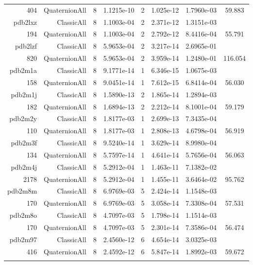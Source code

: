 \begin{xltabular}{\textwidth}{r|rcS[table-format=1.4e+2]cS[table-format=1.3e+2]S[table-format=1.4e+2]S[table-format=-1.3]}
404 & QuaternionAll & 8 & 1.1215e-10 & 2 & 1.025e-12 & 1.7960e-03 & 59.883\\  \addlinespace
pdb2lxz & ClassicAll & 8 & 1.1003e-04 & 2 & 2.371e-12 & 1.3151e-03 & \\
194 & QuaternionAll & 8 & 1.1003e-04 & 2 & 2.792e-12 & 8.4416e-04 & 55.791\\  \addlinespace
pdb2lzf & ClassicAll & 8 & 5.9653e-04 & 2 & 3.217e-14 & 2.6965e-01 & \\
820 & QuaternionAll & 8 & 5.9653e-04 & 2 & 3.959e-14 & 1.2480e-01 & 116.054\\  \addlinespace
pdb2m1a & ClassicAll & 8 & 9.1771e-14 & 1 & 6.346e-15 & 1.0675e-03 & \\
158 & QuaternionAll & 8 & 9.0451e-14 & 1 & 7.612e-15 & 6.8414e-04 & 56.030\\  \addlinespace
pdb2m1j & ClassicAll & 8 & 1.5890e-13 & 2 & 1.865e-14 & 1.2894e-03 & \\
182 & QuaternionAll & 8 & 1.6894e-13 & 2 & 2.212e-14 & 8.1001e-04 & 59.179\\  \addlinespace
pdb2m2y & ClassicAll & 8 & 1.8177e-03 & 1 & 2.699e-13 & 7.3435e-04 & \\
110 & QuaternionAll & 8 & 1.8177e-03 & 1 & 2.808e-13 & 4.6798e-04 & 56.919\\  \addlinespace
pdb2m3f & ClassicAll & 8 & 9.5240e-14 & 1 & 3.629e-14 & 8.9980e-04 & \\
134 & QuaternionAll & 8 & 5.7597e-14 & 1 & 4.641e-14 & 5.7656e-04 & 56.063\\  \addlinespace
pdb2m4j & ClassicAll & 8 & 5.2912e-04 & 1 & 1.463e-11 & 7.1382e-02 & \\
2178 & QuaternionAll & 8 & 5.2912e-04 & 1 & 1.455e-11 & 3.6464e-02 & 95.762\\  \addlinespace
pdb2m8m & ClassicAll & 8 & 6.9769e-03 & 5 & 2.424e-14 & 1.1548e-03 & \\
170 & QuaternionAll & 8 & 6.9769e-03 & 5 & 3.058e-14 & 7.3308e-04 & 57.531\\  \addlinespace
pdb2m8o & ClassicAll & 8 & 4.7097e-03 & 5 & 1.798e-14 & 1.1514e-03 & \\
170 & QuaternionAll & 8 & 4.7097e-03 & 5 & 2.301e-14 & 7.3586e-04 & 56.474\\  \addlinespace
pdb2m97 & ClassicAll & 8 & 2.4560e-12 & 6 & 4.654e-14 & 3.0325e-03 & \\
416 & QuaternionAll & 8 & 2.4592e-12 & 6 & 5.847e-14 & 1.8992e-03 & 59.672\\  \addlinespace

\end{xltabular}
